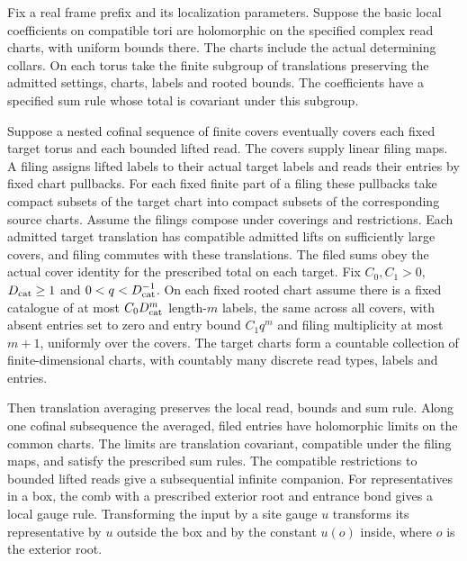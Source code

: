 \documentclass[11pt,letterpaper,reqno]{amsart}
\makeatletter
\numberwithin{equation}{section}
\theoremstyle{definition}
\newcommand{\ms@minorstart}{%
  \pushQED{\qed}\renewcommand{\qedsymbol}{$\blacksquare$}}
\newenvironment{lemma}[1][]{\ms@minorstart\ms@lemma[#1]}
  {\popQED\endms@lemma}
\theoremstyle{remark}
\makeatother
\begin{document}
\begin{lemma}[A conditional construction of coherent coefficients]
\label{rt:lem-coherent-supply}
Fix a real frame prefix and its localization parameters. Suppose the
basic local coefficients on compatible tori are holomorphic on the
specified complex read charts, with uniform bounds there. The charts
include the actual determining collars. On each torus take the finite
subgroup of translations preserving the admitted settings, charts,
labels and rooted bounds. The coefficients have a specified sum rule
whose total is covariant under this subgroup.

Suppose a nested cofinal sequence of finite covers eventually covers
each fixed target torus and each bounded lifted read. The covers
supply linear filing maps. A filing assigns lifted labels to their
actual target labels and reads their entries by fixed chart pullbacks.
For each fixed finite part of a filing these pullbacks take compact
subsets of the target chart into compact subsets of the corresponding
source charts. Assume the filings compose under coverings and
restrictions. Each admitted target translation has compatible admitted
lifts on sufficiently large covers, and filing commutes with these
translations. The filed sums obey the actual cover identity for the
prescribed total on each target. Fix $C_0,C_1>0$, $D_{\rm cat}\ge1$ and $0<q<D_{\rm cat}^{-1}$.
On each fixed rooted chart assume there is a fixed catalogue of at most $C_0 D_{\rm cat}^m$ length-$m$ labels,
the same across all covers, with absent entries set to zero and entry bound $C_1q^m$
and filing multiplicity at most $m+1$, uniformly over the
covers. The target charts form a countable collection of finite-dimensional
charts, with countably many
discrete read types, labels and entries.

Then translation averaging preserves the local read, bounds and sum
rule. Along one cofinal subsequence the averaged, filed entries have
holomorphic limits on the common charts. The limits are translation
covariant, compatible under the filing maps, and satisfy the
prescribed sum rules. The compatible restrictions to bounded lifted
reads give a subsequential infinite companion. For representatives in
a box, the comb with a prescribed exterior root and entrance bond
gives a local gauge rule. Transforming the input by a site gauge $u$
transforms its representative by $u$ outside the box and by the
constant $u(o)$ inside, where $o$ is the exterior root.
\end{lemma}
\end{document}
